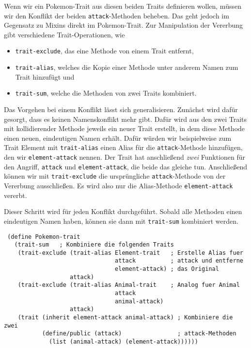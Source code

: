Wenn wir ein Pokemon-Trait aus diesen beiden Traits definieren wollen, müssen wir den Konflikt der beiden \texttt{attack}-Methoden beheben. Das geht jedoch im Gegensatz zu Mixins direkt im Pokemon-Trait. Zur Manipulation der Vererbung gibt verschiedene Trait-Operationen, wie
\begin{itemize}
 \item \texttt{trait-exclude}, das eine Methode von einem Trait entfernt,
 \item \texttt{trait-alias}, welches die Kopie einer Methode unter anderem Namen zum Trait hinzufügt und
 \item \texttt{trait-sum}, welche die Methoden von zwei Traits kombiniert.
\end{itemize}

Das Vorgehen bei einem Konflikt lässt sich generalisieren. Zunächst wird dafür gesorgt, dass es keinen Namenskonflikt mehr gibt. Dafür wird aus den zwei Traits mit kollidierender Methode jeweils ein neuer Trait erstellt, in dem diese Methode einen neuen, eindeutigen Namen erhält. Dafür würden wir beispielweise zum Trait Element mit \texttt{trait-alias} einen Alias für die \texttt{attack}-Methode hinzufügen, den wir \texttt{element-attack} nennen. Der Trait hat anschließend \emph{zwei} Funktionen für den Angriff, \texttt{attack} und \texttt{element-attack}, die beide das gleiche tun. Anschließend können wir mit \texttt{trait-exclude} die ursprüngliche \texttt{attack}-Methode von der Vererbung ausschließen. Es wird also nur die Alias-Methode \texttt{element-attack} vererbt.

Dieser Schritt wird für jeden Konflikt durchgeführt. Sobald alle Methoden einen eindeutigen Namen haben, können sie dann mit \texttt{trait-sum} kombiniert werden.

\begin{lstlisting}
 (define Pokemon-trait
   (trait-sum   ; Kombiniere die folgenden Traits
    (trait-exclude (trait-alias Element-trait   ; Erstelle Alias fuer
                                attack          ; attack und entferne
                                element-attack) ; das Original
                   attack)
    (trait-exclude (trait-alias Animal-trait    ; Analog fuer Animal
                                attack         
                                animal-attack)
                   attack)
    (trait (inherit element-attack animal-attack) ; Kombiniere die zwei
           (define/public (attack)                ; attack-Methoden
             (list (animal-attack) (element-attack))))))
\end{lstlisting}

